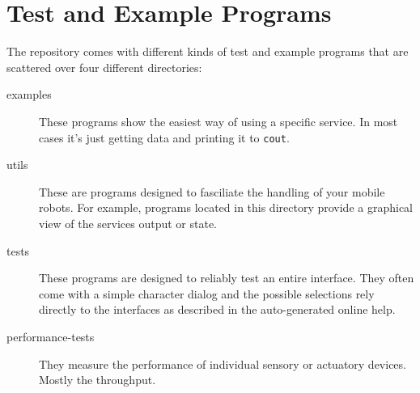 \chapter{Test and Example Programs}
\label{sec:clients}

The \miro repository comes with different kinds of test and
example programs that are scattered over four different directories:

\begin{description}
\item[examples]
  These programs show the easiest way of using a
  specific service. In most cases it's just getting data and printing
  it to {\tt cout}.
\item[utils] These are programs designed to fasciliate the handling of
  your mobile robots. For example, programs located in this directory
  provide a graphical view of the services output or state.
\item[tests]
  These programs are designed to reliably
  test an entire interface. They often come with a simple character
  dialog and the possible selections rely directly to the interfaces
  as described in the auto-generated online help.
\item[performance-tests]
  They measure the performance of individual
  sensory or actuatory devices. Mostly the throughput.
\end{description}








